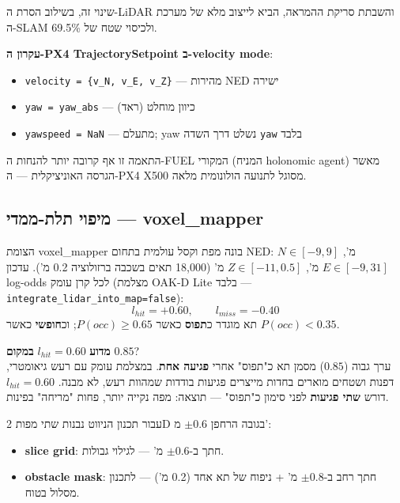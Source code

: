 \documentclass[11pt,a4paper]{article}
\begin{document}
שינוי זה, בשילוב הסרת ה-\textenglish{LiDAR} והשבתת סריקת ההמראה, הביא לייצוב מלא של מערכת ה-\textenglish{SLAM} ולכיסוי שטח של 69.5\%.

\textbf{עקרון ה-\textenglish{PX4 TrajectorySetpoint} ב-velocity mode}:
\begin{itemize}
    \item \texttt{velocity = \{v\_N, v\_E, v\_Z\}} — מהירות NED ישירה
    \item \texttt{yaw = yaw\_abs} — כיוון מוחלט (ראד)
    \item \texttt{yawspeed = NaN} — מתעלם; yaw נשלט דרך השדה \texttt{yaw} בלבד
\end{itemize}

התאמה זו אף קרובה יותר להנחות ה-\textenglish{FUEL} המקורי (המניח \textenglish{holonomic agent}) מאשר הגרסה האוניציקלית — ה-\textenglish{PX4 X500} מסוגל לתנועה הולונומית מלאה.

\subsection{מיפוי תלת-ממדי — \textenglish{voxel\_mapper}}

הצומת \textenglish{voxel\_mapper} בונה מפת וקסל עולמית בתחום \textenglish{NED}: $N \in [-9, 9]$ מ', $E \in [-9, 31]$ מ', $Z \in [-11, 0.5]$ מ' (18,000 תאים בשכבה ברזולוציה 0.2 מ'). עדכון \textenglish{log-odds} לכל קרן עומק (מצלמת \textenglish{OAK-D Lite} בלבד — \texttt{integrate\_lidar\_into\_map=false}):
\begin{equation}
    l_{hit} = +0.60, \qquad l_{miss} = -0.40
\end{equation}
תא מוגדר כ\textbf{תפוס} כאשר $P(occ) \geq 0.65$; וכ\textbf{חופשי} כאשר $P(occ) < 0.35$.

\textbf{מדוע} $l_{hit}=0.60$ \textbf{במקום} $0.85$? \\
ערך גבוה ($0.85$) מסמן תא כ"תפוס" אחרי \textbf{פגיעה אחת}. במצלמת עומק עם רעש גיאומטרי, דפנות ושטחים מוארים בחדות מייצרים פגיעות בודדות שמהוות רעש, לא מבנה. $l_{hit}=0.60$ דורש \textbf{שתי פגיעות} לפני סימון כ"תפוס" — תוצאה: מפה נקייה יותר, פחות "מריחה" בפינות.

עבור תכנון הניווט נבנות שתי מפות 2D בגובה הרחפן $\pm 0.6$ מ':
\begin{itemize}
    \item \textbf{\textenglish{slice grid}}: חתך ב-$\pm 0.6$ מ' — לגילוי גבולות.
    \item \textbf{\textenglish{obstacle mask}}: חתך רחב ב-$\pm 0.8$ מ' + ניפוח של תא אחד (0.2 מ') — לתכנון מסלול בטוח.
\end{itemize}
\end{document}
